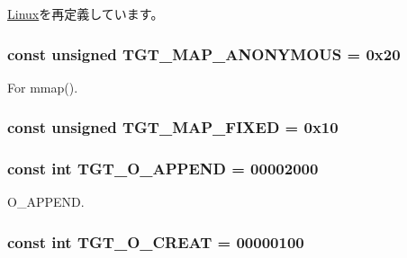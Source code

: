 \hyperlink{classLinux_a1def346ff527c8efccfd52463f3b5dc1}{Linux}を再定義しています。\hypertarget{classPowerLinux_a0bbc267200567dd98250b99b6085a499}{
\subsubsection[{TGT\_\-MAP\_\-ANONYMOUS}]{\setlength{\rightskip}{0pt plus 5cm}const unsigned {\bf TGT\_\-MAP\_\-ANONYMOUS} = 0x20}}
\label{classPowerLinux_a0bbc267200567dd98250b99b6085a499}


For mmap(). \hypertarget{classPowerLinux_a0124e421d7846143bca15728b7a53e14}{
\subsubsection[{TGT\_\-MAP\_\-FIXED}]{\setlength{\rightskip}{0pt plus 5cm}const unsigned {\bf TGT\_\-MAP\_\-FIXED} = 0x10}}
\label{classPowerLinux_a0124e421d7846143bca15728b7a53e14}
\hypertarget{classPowerLinux_af11adc5404ea3780a5ce2829cc3710b7}{
\subsubsection[{TGT\_\-O\_\-APPEND}]{\setlength{\rightskip}{0pt plus 5cm}const int {\bf TGT\_\-O\_\-APPEND} = 00002000}}
\label{classPowerLinux_af11adc5404ea3780a5ce2829cc3710b7}


O\_\-APPEND. \hypertarget{classPowerLinux_aec02e04ca367e6c3f4b46e4edc12efac}{
\subsubsection[{TGT\_\-O\_\-CREAT}]{\setlength{\rightskip}{0pt plus 5cm}const int {\bf TGT\_\-O\_\-CREAT} = 00000100}}
\label{classPowerLinux_aec02e04ca367e6c3f4b46e4edc12efac}



